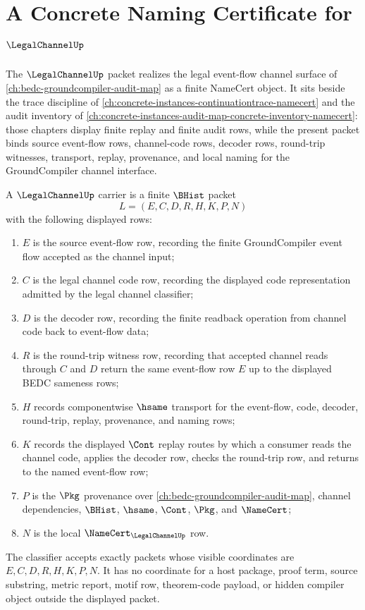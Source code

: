 \chapter{A Concrete Naming Certificate for $\LegalChannelUp$}
\label{ch:concrete-instances-legalchannel-namecert}

The $\LegalChannelUp$ packet realizes the legal event-flow channel surface of \autoref{ch:bedc-groundcompiler-audit-map} as a finite NameCert object. It sits beside the trace discipline of \autoref{ch:concrete-instances-continuationtrace-namecert} and the audit inventory of \autoref{ch:concrete-instances-audit-map-concrete-inventory-namecert}: those chapters display finite replay and finite audit rows, while the present packet binds source event-flow rows, channel-code rows, decoder rows, round-trip witnesses, transport, replay, provenance, and local naming for the GroundCompiler channel interface.

\begin{definition}
\label{def:legal-channel-carrier}
A $\LegalChannelUp$ carrier is a finite $\BHist$ packet
$$
L=(E,C,D,R,H,K,P,N)
$$
with the following displayed rows:
\begin{enumerate}
\item $E$ is the source event-flow row, recording the finite GroundCompiler event flow accepted as the channel input;
\item $C$ is the legal channel code row, recording the displayed code representation admitted by the legal channel classifier;
\item $D$ is the decoder row, recording the finite readback operation from channel code back to event-flow data;
\item $R$ is the round-trip witness row, recording that accepted channel reads through $C$ and $D$ return the same event-flow row $E$ up to the displayed BEDC sameness rows;
\item $H$ records componentwise $\hsame$ transport for the event-flow, code, decoder, round-trip, replay, provenance, and naming rows;
\item $K$ records the displayed $\Cont$ replay routes by which a consumer reads the channel code, applies the decoder row, checks the round-trip row, and returns to the named event-flow row;
\item $P$ is the $\Pkg$ provenance over \autoref{ch:bedc-groundcompiler-audit-map}, channel dependencies, $\BHist$, $\hsame$, $\Cont$, $\Pkg$, and $\NameCert$;
\item $N$ is the local $\NameCert_{\LegalChannelUp}$ row.
\end{enumerate}
The classifier accepts exactly packets whose visible coordinates are $E,C,D,R,H,K,P,N$. It has no coordinate for a host package, proof term, source substring, metric report, motif row, theorem-code payload, or hidden compiler object outside the displayed packet.
\end{definition}

